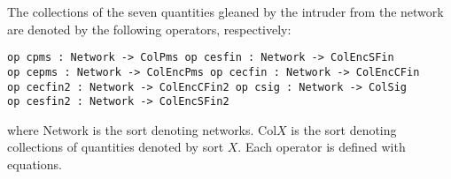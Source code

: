 \documentclass[a4paper,fleqn]{cas-dc}
\begin{document}
The collections of the seven quantities gleaned by the intruder from the network are denoted by the following operators, respectively:
\begin{small}
\begin{verbatim}
op cpms : Network -> ColPms op cesfin : Network -> ColEncSFin
op cepms : Network -> ColEncPms op cecfin : Network -> ColEncCFin
op cecfin2 : Network -> ColEncCFin2 op csig : Network -> ColSig
op cesfin2 : Network -> ColEncSFin2 
\end{verbatim}
\end{small}	
where Network is the sort denoting networks. Col$X$ is
the sort denoting collections of quantities denoted
by sort $X$. Each operator is defined with equations.
\end{document}

